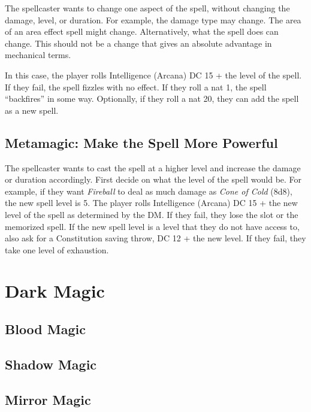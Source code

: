 \documentclass[twocolumn]{dndbook}
\begin{document}
The spellcaster wants to change one aspect of the spell, without changing the damage, level, or duration.
For example, the damage type may change.
The area of an area effect spell might change.
Alternatively, what the spell does can change.
This should not be a change that gives an absolute advantage in mechanical terms.\par

In this case, the player rolls Intelligence (Arcana) DC 15 + the level of the spell.
If they fail, the spell fizzles with no effect.
If they roll a nat 1, the spell ``backfires'' in some way.
Optionally, if they roll a nat 20, they can add the spell as a new spell.\par


\subsection{Metamagic: Make the Spell More Powerful}
The spellcaster wants to cast the spell at a higher level and increase the damage or duration accordingly.
First decide on what the level of the spell would be. For example, if they want \emph{Fireball} to deal as much damage as \emph{Cone of Cold} (8d8), the new spell level is 5.
The player rolls Intelligence (Arcana) DC 15 + the new level of the spell as determined by the DM.
If they fail, they lose the slot or the memorized spell.
If the new spell level is a level that they do not have access to, also ask for a Constitution saving throw, DC 12 + the new level.
If they fail, they take one level of exhaustion.



\section{Dark Magic}

\subsection{Blood Magic}

\subsection{Shadow Magic}

\subsection{Mirror Magic}
\end{document}
